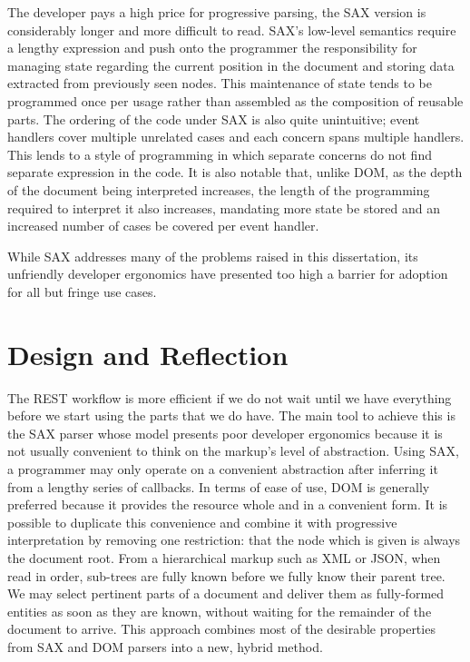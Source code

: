 \documentclass[12pt, ]{article}
\let\stdsection\section
\renewcommand\section{\newpage\stdsection}
\begin{document}
The developer pays a high price for progressive parsing, the SAX version
is considerably longer and more difficult to read. SAX's low-level
semantics require a lengthy expression and push onto the programmer the
responsibility for managing state regarding the current position in the
document and storing data extracted from previously seen nodes. This
maintenance of state tends to be programmed once per usage rather than
assembled as the composition of reusable parts. The ordering of the code
under SAX is also quite unintuitive; event handlers cover multiple
unrelated cases and each concern spans multiple handlers. This lends to
a style of programming in which separate concerns do not find separate
expression in the code. It is also notable that, unlike DOM, as the
depth of the document being interpreted increases, the length of the
programming required to interpret it also increases, mandating more
state be stored and an increased number of cases be covered per event
handler.

While SAX addresses many of the problems raised in this dissertation,
its unfriendly developer ergonomics have presented too high a barrier
for adoption for all but fringe use cases.

\section{Design and Reflection}\label{design-and-reflection}

The REST workflow is more efficient if we do not wait until we have
everything before we start using the parts that we do have. The main
tool to achieve this is the SAX parser whose model presents poor
developer ergonomics because it is not usually convenient to think on
the markup's level of abstraction. Using SAX, a programmer may only
operate on a convenient abstraction after inferring it from a lengthy
series of callbacks. In terms of ease of use, DOM is generally preferred
because it provides the resource whole and in a convenient form. It is
possible to duplicate this convenience and combine it with progressive
interpretation by removing one restriction: that the node which is given
is always the document root. From a hierarchical markup such as XML or
JSON, when read in order, sub-trees are fully known before we fully know
their parent tree. We may select pertinent parts of a document and
deliver them as fully-formed entities as soon as they are known, without
waiting for the remainder of the document to arrive. This approach
combines most of the desirable properties from SAX and DOM parsers into
a new, hybrid method.
\end{document}
